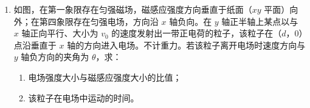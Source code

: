 \documentclass[\gkver]{gaokaozhenti}
\begin{document}
\begin{enumerate}
{$mv-MV=MV'$ ①

代入数据得

$V'=1.0\Ums$ ②

（2）设碰撞过程中总机械能的损失为 $\Delta E$，应有

$\frac{1}{2}mv^2+\frac{1}{2}MV^2=\frac{1}{2}MV'^2+\Delta E$ ③

联立②③式，代入数据得

$\Delta E=1400\UJ$ ④
}

\item
如图，在第一象限存在匀强磁场，磁感应强度方向垂直于纸面（$xy$ 平面）向外；在第四象限存在匀强电场，方向沿 $x$ 轴负向。在 $y$ 轴正半轴上某点以与 $x$ 轴正向平行、大小为 $v_0$ 的速度发射出一带正电荷的粒子，该粒子在（$d$，$0$）点沿垂直于 $x$ 轴的方向进入电场。不计重力。若该粒子离开电场时速度方向与 $y$ 轴负方向的夹角为 $\theta$，求：
\begin{enumerate}
	\item
	电场强度大小与磁感应强度大小的比值；
	\item
	该粒子在电场中运动的时间。
\end{enumerate}
\end{enumerate}
\end{document}
